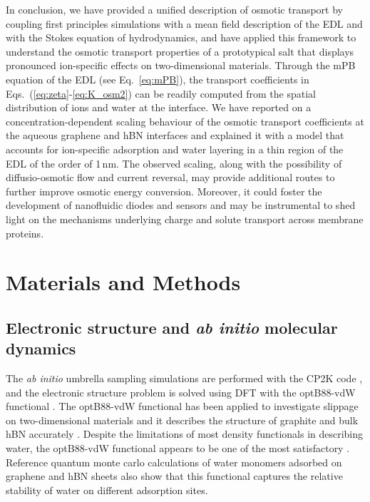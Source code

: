 \documentclass[journal=ancac3,manuscript=article,layout=twocolumn]{achemso}
\begin{document}
In conclusion, we have provided a unified description of
osmotic transport by coupling first principles simulations with a
mean field description of the EDL and with the Stokes equation
of hydrodynamics, and have applied this framework to understand
the osmotic transport properties of a
prototypical salt that displays pronounced
ion-specific effects on two-dimensional materials.
Through the mPB equation of the EDL (see Eq.~\eqref{eq:mPB}),
the transport coefficients in
Eqs.~(\ref{eq:zeta}-\ref{eq:K_osm2}) can
be readily computed from the spatial
distribution of ions and water
at the interface.
We have reported on a concentration-dependent
scaling behaviour of the osmotic transport coefficients
at the aqueous graphene and hBN interfaces
and explained it with a model that
accounts for ion-specific adsorption and
water layering in a thin region of the EDL
 of the order of 1\,nm.
The observed scaling, along with the possibility of
diffusio-osmotic flow and
current reversal, may provide additional routes
to further improve osmotic energy conversion.
%
Moreover, it could foster the development of nanofluidic
diodes and sensors and may be instrumental to shed light
on the mechanisms underlying
charge and solute transport across membrane proteins.


%
\section*{Materials and Methods}
\subsection*{Electronic structure and \textit{ab initio} molecular dynamics}
The \textit{ab initio} umbrella sampling
simulations are performed with
the CP2K code \cite{kuhne2020cp2k}, and the
electronic structure problem is solved using DFT
with the optB88-vdW functional \cite{jiri_solids,jiri_molecules}.
The optB88-vdW functional has been applied to investigate slippage
on two-dimensional materials \cite{Joly2016,tocci2020nanoscale}
and it describes the  structure of graphite and bulk hBN
accurately \cite{graziano_vdw_gra_bn}.
Despite the limitations of most density functionals
in describing water, the optB88-vdW functional appears
to be one of the most satisfactory \cite{gillan2016perspective}.
Reference quantum monte carlo calculations
of water monomers adsorbed on graphene and hBN sheets
\cite{brandenburg2019physisorption,al2015communication}
also show that this functional captures the relative stability
of water on different adsorption sites.
\end{document}
